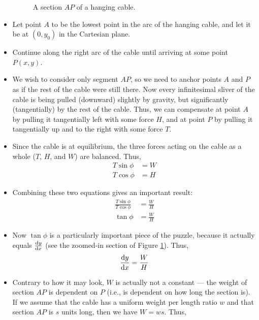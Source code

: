 \documentclass[../main.tex]{subfiles}
\begin{document}
\begin{itemize}
\begin{figure}[h!]
        \caption{A section $AP$ of a hanging cable.}
        \label{fig:hangingAP}
    \end{figure}
    \item Let point $A$ to be the lowest point in the arc of the hanging cable, and let it be at $(0,y_0)$ in the Cartesian plane.
    \item Continue along the right arc of the cable until arriving at some point $P(x,y)$.
    \item We wish to consider only segment $AP$, so we need to anchor points $A$ and $P$ as if the rest of the cable were still there. Now every infinitesimal sliver of the cable is being pulled (downward) slightly by gravity, but significantly (tangentially) by the rest of the cable. Thus, we can compensate at point $A$ by pulling it tangentially left with some force $H$, and at point $P$ by pulling it tangentially up and to the right with some force $T$.
    \item Since the cable is at equilibrium, the three forces acting on the cable as a whole ($T$, $H$, and $W$) are balanced. Thus,
    \begin{align*}
        T\sin\phi &= W\\
        T\cos\phi &= H
    \end{align*}
    \item Combining these two equations gives an important result:
    \begin{align*}
        \frac{T\sin\phi}{T\cos\phi} &= \frac{W}{H}\\
        \tan\phi &= \frac{W}{H}
    \end{align*}
    \item Now $\tan\phi$ is a particularly important piece of the puzzle, because it actually equals $\dv{y}{x}$ (see the zoomed-in section of Figure \ref{fig:hangingAP}). Thus,
    \begin{equation*}
        \dv{y}{x} = \frac{W}{H}
    \end{equation*}
    \item Contrary to how it may look, $W$ is actually not a constant --- the weight of section $AP$ is dependent on $P$ (i.e., is dependent on how long the section is). If we assume that the cable has a uniform weight per length ratio $w$ and that section $AP$ is $s$ units long, then we have $W=ws$. Thus,
    \begin{equation*}

\end{equation*}
\end{itemize}
\end{document}
